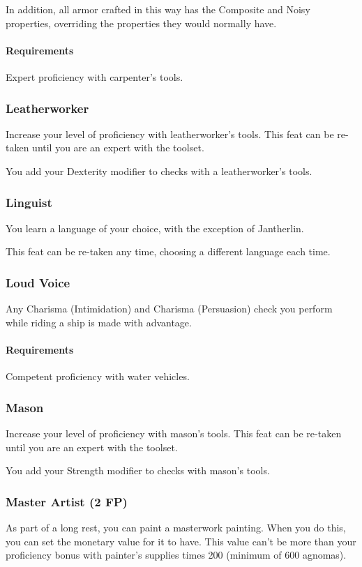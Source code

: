     In addition, all armor crafted in this way has the Composite and Noisy properties, overriding the properties they would normally have.
    \paragraph{Requirements} Expert proficiency with carpenter's tools.
\subsubsection{Leatherworker} \label{feat::leatherworker}
    Increase your level of proficiency with leatherworker's tools.
    This feat can be re-taken until you are an expert with the toolset.

    You add your Dexterity modifier to checks with a leatherworker's tools.
\subsubsection{Linguist} \label{feat::linguist}
    You learn a language of your choice, with the exception of Jantherlin.

    This feat can be re-taken any time, choosing a different language each time.
\subsubsection{Loud Voice} \label{feat::loudvoice}
    Any Charisma (Intimidation) and Charisma (Persuasion) check you perform while riding a ship is made with advantage.
    \paragraph{Requirements} Competent proficiency with water vehicles.
\subsubsection{Mason} \label{feat::mason}
    Increase your level of proficiency with mason's tools.
    This feat can be re-taken until you are an expert with the toolset.

    You add your Strength modifier to checks with mason's tools.
\subsubsection{Master Artist (2 FP)} \label{feat::masterartist}
    As part of a long rest, you can paint a masterwork painting.
    When you do this, you can set the monetary value for it to have.
    This value can't be more than your proficiency bonus with painter's supplies times 200 (minimum of 600 agnomas).
